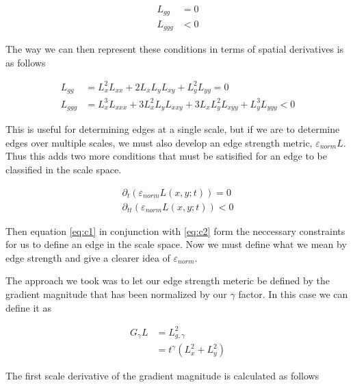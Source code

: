 \documentclass{article}
\begin{document}
\begin{equation} \label{eq:c1}
  \begin{aligned}
    L_{gg} &= 0 \\
    L_{ggg} &< 0
  \end{aligned}
\end{equation}

The way we can then represent these conditions in terms of spatial derivatives is as follows

\begin{equation}
  \begin{aligned}
    L_{gg} &= L_x^2L_{xx}+2L_xL_yL_{xy}+L_y^2L_{yy} = 0 \\
    L_{ggg} &= L_x^3L_{xxx} +3L_x^2L_yL_{xxy}+3L_xL_y^2L_{xyy}+L_y^3L_{yyy} < 0
  \end{aligned}
\end{equation}

This is useful for determining edges at a single scale, but if we are to determine edges over multiple scales, we must also develop an edge strength metric, $\varepsilon_{norm}L$.
Thus this adds two more conditions that must be satisified for an edge to be classified in the scale space. 

\begin{equation} \label{eq:c2}
  \begin{aligned}
    \partial_t(\varepsilon_{norm}L(x,y;t)) = 0\\
    \partial_{tt}(\varepsilon_{norm}L(x,y;t)) < 0
  \end{aligned}
\end{equation}

Then equation \ref{eq:c1} in conjunction with \ref{eq:c2} form the neccessary constraints for us to define an edge in the scale space.
Now we must define what we mean by edge strength and give a clearer idea of $\varepsilon_{norm}$.

The approach we took was to let our edge strength meteric be defined by the gradient magnitude that has been normalized by our $\gamma$ factor.
In this case we can define it as 

\begin{equation}
  \begin{aligned}
    G_{\gamma}L &= L_{g,\gamma}^2 \\
    &= t^{\gamma}(L_x^2+L_y^2)
  \end{aligned}
\end{equation}

The first scale derivative of the gradient magnitude is calculated as follows
\end{document}

